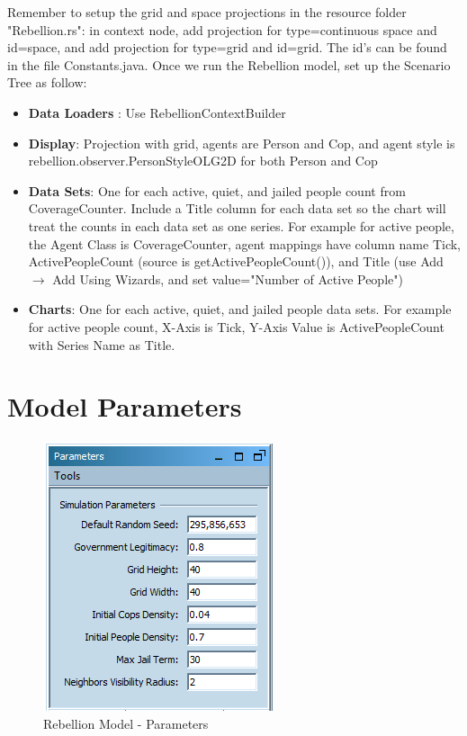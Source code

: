 \documentclass[11pt]{amsart}
\begin{document}
Remember to setup the grid and space projections in the resource folder "Rebellion.rs": in context node, add projection for type=continuous space and id=space, and add projection for type=grid and id=grid.  The id's can be found in the file Constants.java.  Once we run the Rebellion model, set up the Scenario Tree as follow:\\
\begin{itemize}
\item \textbf{Data Loaders} : Use RebellionContextBuilder
\item\textbf{Display}: Projection with grid, agents are Person and Cop, and agent style is  rebellion.observer.PersonStyleOLG2D for both Person and Cop
\item \textbf{Data Sets}: One for each active, quiet, and jailed people count from CoverageCounter.  Include a Title column for each data set so the chart will treat the counts in each data set as one series.  For example for active people, the Agent Class is CoverageCounter, agent mappings have column name Tick, ActivePeopleCount (source is getActivePeopleCount()), and Title (use Add $\rightarrow$ Add Using Wizards, and set value="Number of Active People")
\item \textbf{Charts}: One for each active, quiet, and jailed people data sets.  For example for active people count, X-Axis is Tick, Y-Axis Value is ActivePeopleCount with Series Name as Title.
\end{itemize}

\section{Model Parameters} 

\begin{figure}[h!]
\centering
\vspace{.2in}
\centerline {
\includegraphics{Images/rebellion_param.png}}
\caption{Rebellion Model - Parameters}
\label{fig:param}
\end{figure}
\end{document}
